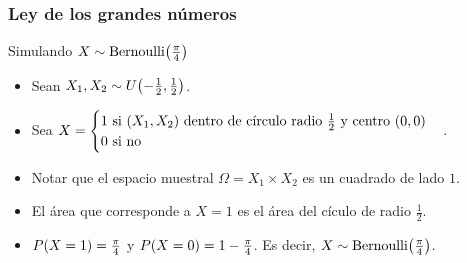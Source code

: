 \documentclass[table]{beamer}
\begin{document}
\begin{frame}
    \frametitle{Ley de los grandes números}
    \begin{block}{Simulando $X \sim \bernoulli{\frac{\pi}{4}}$}
        \begin{itemize}
            \item Sean $X_{1} , X_{2} \sim \uniform{- \frac{1}{2}}{\frac{1}{2}}$.
            \item Sea $X = \begin{cases} 1 \text{ si } \parens{X_{1}, X_{2}} \text{ dentro de círculo radio } \frac{1}{2} \text{ y centro } \parens{0, 0} \\ 0 \text{ si no} \end{cases}$.
            \item Notar que el espacio muestral $\Omega = X_{1} \times X_{2}$ es un cuadrado de lado $1$.
            \item El área que corresponde a $X = 1$ es el área del cículo de radio $\frac{1}{2}$.
            \item $\prob{X = 1} = \frac{\pi}{4}$ y $\prob{X = 0} = 1 - \frac{\pi}{4}$. Es decir, $X \sim \bernoulli{\frac{\pi}{4}}$.
        \end{itemize}
    \end{block}


\end{frame}
\end{document}
